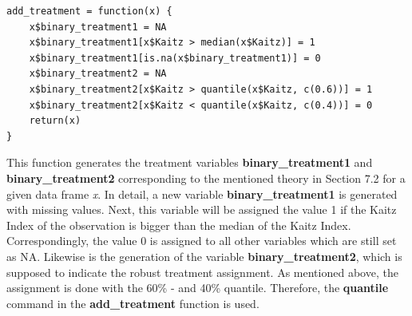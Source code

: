 \documentclass[a4paper]{article}
\begin{document}
{\begin{lstlisting}
add_treatment = function(x) {
    x$binary_treatment1 = NA
    x$binary_treatment1[x$Kaitz > median(x$Kaitz)] = 1
    x$binary_treatment1[is.na(x$binary_treatment1)] = 0
    x$binary_treatment2 = NA
    x$binary_treatment2[x$Kaitz > quantile(x$Kaitz, c(0.6))] = 1
    x$binary_treatment2[x$Kaitz < quantile(x$Kaitz, c(0.4))] = 0
    return(x)
}
\end{lstlisting}
This function generates the treatment variables \textbf{binary\_treatment1} and \textbf{binary\_treatment2} corresponding to the mentioned theory in Section 7.2 for a given data frame \textit{x}.
In detail, a new variable \textbf{binary\_treatment1} is generated with missing values. Next, this variable will be assigned the value 1 if the Kaitz Index of the observation is bigger than the median of the Kaitz Index. Correspondingly, the value 0 is assigned to all other variables which are still set as NA. Likewise is the generation of the variable \textbf{binary\_treatment2}, which is supposed to indicate the robust treatment assignment. As mentioned above, the assignment is done with the 60\% - and 40\% quantile. Therefore, the \textbf{quantile} command in the \textbf{add\_treatment} function is used. 

}
\end{document}
